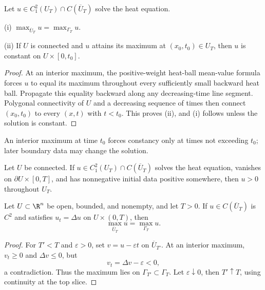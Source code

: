 \begin{theorem}
\label{thm:strong-maximum-principle-heat-equation}
Let $u\in C_1^2(U_T)\cap C(\overline U_T)$ solve the heat equation.

(i) $\max_{\overline U_T}u=\max_{\Gamma_T}u$.

(ii) If $U$ is connected and $u$ attains its maximum at
$(x_0,t_0)\in U_T$, then $u$ is constant on $U\times[0,t_0]$.
\end{theorem}
\begin{proof}
\sketch At an interior maximum, the positive-weight heat-ball mean-value
formula forces $u$ to equal its maximum throughout every sufficiently small
backward heat ball. Propagate this equality backward along any decreasing-time
line segment. Polygonal connectivity of $U$ and a decreasing sequence of times
then connect $(x_0,t_0)$ to every $(x,t)$ with $t<t_0$. This proves (ii), and
(i) follows unless the solution is constant.
\end{proof}

\begin{remark}
\label{rem:strong-maximum-principle-heat-time-intuition}
An interior maximum at time $t_0$ forces constancy only at times not exceeding
$t_0$; later boundary data may change the solution.
\end{remark}

\begin{remark}
\label{rem:strong-maximum-principle-heat-positivity}
Let $U$ be connected. If $u\in C_1^2(U_T)\cap C(\overline U_T)$ solves the
heat equation, vanishes on $\partial U\times[0,T]$, and has nonnegative initial
data positive somewhere, then $u>0$ throughout $U_T$.
\end{remark}

\begin{theorem}
\label{thm:weak-maximum-principle-heat}
\leanok
Let $U\subset\R^n$ be open, bounded, and nonempty, and let $T>0$. If
$u\in C(\overline U_T)$ is $C^2$ and satisfies $u_t=\Delta u$ on
$U\times(0,T)$, then
$$\max_{\overline U_T}u=\max_{\Gamma_T}u.$$
\end{theorem}
\begin{proof}
\leanok
\sketch For $T'<T$ and $\varepsilon>0$, set $v=u-\varepsilon t$ on
$\overline U_{T'}$. At an interior maximum, $v_t\ge0$ and $\Delta v\le0$, but
$$v_t=\Delta v-\varepsilon<0,$$
a contradiction. Thus the maximum lies on $\Gamma_{T'}\subset\Gamma_T$.
Let $\varepsilon\downarrow0$, then $T'\uparrow T$, using continuity at the top
slice.
\end{proof}


